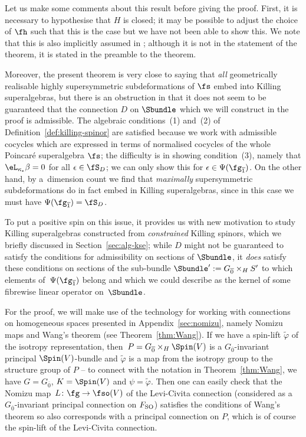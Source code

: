 \begin{Remark}
	Let us make some comments about this result before giving the proof. First, it is necessary to hypothesise that $H$ is closed; it may be possible to adjust the choice of $\fh$ such that this is the case but we have not been able to show this. We note that this is also implicitly assumed in \cite[Theorem~13]{Figueroa-OFarrill2017_1}; although it is not in the statement of the theorem, it is stated in the preamble to the theorem.
	
	Moreover, the present theorem is very close to saying that \emph{all} geometrically realisable highly supersymmetric subdeformations of $\fs$ embed into Killing superalgebras, but there is an obstruction in that it does not seem to be guaranteed that the connection $D$ on $\Sbundle$ which we will construct in the proof is admissible. The algebraic conditions~(1) and~(2) of Definition~\ref{def:killing-spinor} are satisfied because we work with admissible cocycles which are expressed in terms of normalised cocycles of the whole Poincar\'e superalgebra $\fs$; the difficulty is in showing condition~(3), namely that $\eL_{\kappa_\epsilon}\beta=0$ for all $\epsilon\in\fS_D$; we can only show this for $\epsilon\in\Psi(\fg_{\overline 1})$. On the other hand, by a~dimension count we find that \emph{maximally} supersymmetric subdeformations do in fact embed in Killing superalgebras, since in this case we must have $\Psi(\fg_{\overline 1})=\fS_D$.
	
	To put a positive spin on this issue, it provides us with new motivation to study Killing superalgebras constructed from \emph{constrained} Killing spinors, which we briefly discussed in Section~\ref{sec:alg-kse}; while $D$ might not be guaranteed to satisfy the conditions for admissibility on sections of $\Sbundle$, it \emph{does} satisfy these conditions on sections of the sub-bundle $\Sbundle':=G_{\overline0}\times_H S'$ to which elements of~$\Psi(\fg_{\overline 1})$ belong and which we could describe as the kernel of some fibrewise linear operator on~$\Sbundle$.
\end{Remark}

For the proof, we will make use of the technology for working with connections on homogeneous spaces presented in Appendix~\ref{sec:nomizu}, namely Nomizu maps and Wang's theorem (see Theorem~\ref{thm:Wang}). If we have a spin-lift $\tilde\varphi$ of the isotropy representation, then~${P=G_{\overline0}\times_H\Spin(V)}$ is a $G_{\overline0}$-invariant principal $\Spin(V)$-bundle and $\tilde\varphi$ is a map from the isotropy group to the structure group of $P$ -- to connect with the notation in Theorem~\ref{thm:Wang}, we have $G=G_{\overline 0}$, $K=\Spin(V)$ and $\psi=\tilde\varphi$. Then one can easily check that the Nomizu map~${L\colon \fg\to\fso(V)}$ of the Levi-Civita connection (considered as a $G_{\overline0}$-invariant principal connection on $F_{\rm SO}$) satisfies the conditions of Wang's theorem so also corresponds with a principal connection on $P$, which is of course the spin-lift of the Levi-Civita connection.

